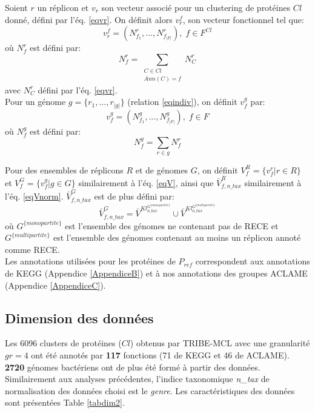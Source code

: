Soient $r$ un réplicon et $v_{r}$ son vecteur associé pour un clustering de protéines $Cl$ donné, défini par l'éq. \ref{eqvr}. On définit alors $v^{f}_{r}$, son vecteur fonctionnel tel que:
	\begin{equation}
		v^{f}_{r}=(N^{r}_{f_{1}},...,N^{r}_{f_{|F|}}),\; f \in F^{Cl}
	\end{equation}
où $N^{r}_{f}$ est défini par:
	\begin{equation}
		N^{r}_{f}=\sum_{\substack{{C \in Cl} \\{Ann(C)=f}}}N^{r}_{C}
	\end{equation}
avec $N^{r}_{C}$ défini par l'éq. \ref{eqvr}. \\

Pour un génome $g=\{r_{1},...,r_{|g|}\}$ (relation \ref{eqindiv}), on définit $v_{f}^{g}$ par:
	\begin{equation}
		v^{g}_{f}=(N^{g}_{f_{1}},...,N^{g}_{f_{|F|}}),\; f \in F
	\end{equation}
où $N^{g}_{f}$ est défini par:
	\begin{equation}
		N^{g}_{f}=\sum_{r \in g}N^{r}_{f}
	\end{equation}

Pour des ensembles de réplicons $R$ et de génomes $G$, on définit $V^{R}_{f}=\{v^{r}_{f}|r \in R\}$ et $V^{G}_{f}=\{v^{g}_{f}|g \in G\}$ similairement à l'éq. \ref{eqV}, ainsi que $\bar{V}^{R}_{f,n\_tax}$ similairement à l'éq. \ref{eqVnorm}. $\bar{V}^{G}_{f,n\_tax}$ est de plus défini par:
	\begin{equation}
		\bar{V}^{G}_{f,n\_tax}=\bar{V}^{Kl_{n\_tax}^{G^{\{monopartite\}}}}\cup\bar{V}^{Kl_{n\_tax}^{G^{\{multipartite\}}}}
	\end{equation}
où $G^{\{monopartite\}}$ est l'ensemble des génomes ne contenant pas de RECE et $G^{\{multipartite\}}$ est l'ensemble des génomes contenant au moins un réplicon annoté comme RECE. \\

Les annotations utilisées pour les protéines de $P_{ref}$ correspondent aux annotations de KEGG (Appendice \ref{AppendiceB}) et à nos annotations des groupes ACLAME (Appendice \ref{AppendiceC}).


\subsection{Dimension des données}
	Les 6096 clusters de protéines ($Cl$) obtenus par TRIBE-MCL avec une granularité $gr = 4$ ont été annotés par \textbf{117} fonctions (71 de KEGG et 46 de ACLAME). \textbf{2720} génomes bactériens ont de plus été formé à partir des données. Similairement aux analyses précédentes, l'indice taxonomique \textit{n\_tax} de normalisation des données choisi est le \textit{genre}. Les caractéristiques des données sont présentées Table \ref{tabdim2}.
	
